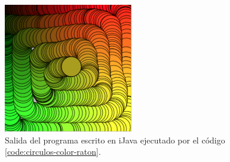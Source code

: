% 
%
%
%
%
%
%
%
%
%


\begin{figure}[!ht]
	\begin{centering}
		\includegraphics[width=0.5\textwidth]{images/salida-code-circulos-color-raton.png}
			\caption{Salida del programa escrito en iJava ejecutado por el código \ref{code:circulos-color-raton}.}
				\label{fig:salida-code-circulos-color-raton}
	\end{centering}
\end{figure}



